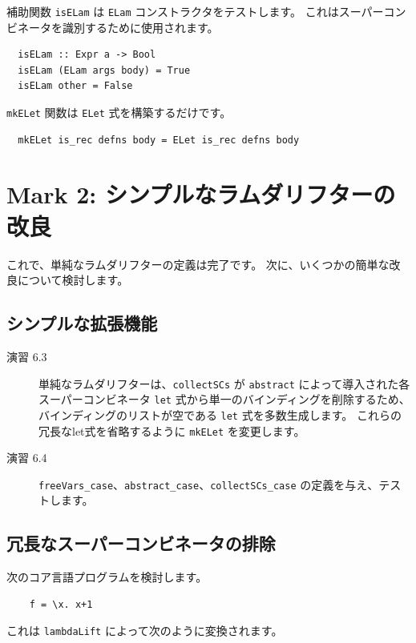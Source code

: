 \documentclass{jbook}
\begin{document}
補助関数 \texttt{isELam} は \texttt{ELam} コンストラクタをテストします。
これはスーパーコンビネータを識別するために使用されます。

\begin{verbatim}
  isELam :: Expr a -> Bool
  isELam (ELam args body) = True
  isELam other = False
\end{verbatim}

\texttt{mkELet} 関数は \texttt{ELet} 式を構築するだけです。

\begin{verbatim}
  mkELet is_rec defns body = ELet is_rec defns body
\end{verbatim}

\section{Mark 2: シンプルなラムダリフターの改良}

これで、単純なラムダリフターの定義は完了です。
次に、いくつかの簡単な改良について検討します。

\subsection{シンプルな拡張機能}

\begin{description}
	\item[演習 6.3] 単純なラムダリフターは、\texttt{collectSCs} が \texttt{abstract} によって導入された各スーパーコンビネータ \texttt{let} 式から単一のバインディングを削除するため、バインディングのリストが空である \texttt{let} 式を多数生成します。
		これらの冗長なlet式を省略するように \texttt{mkELet} を変更します。
	\item[演習 6.4] \texttt{freeVars\_case}、\texttt{abstract\_case}、\texttt{collectSCs\_case} の定義を与え、テストします。
\end{description}

\subsection{冗長なスーパーコンビネータの排除}

次のコア言語プログラムを検討します。

\begin{verbatim}
    f = \x. x+1
\end{verbatim}

これは \texttt{lambdaLift} によって次のように変換されます。
\end{document}
